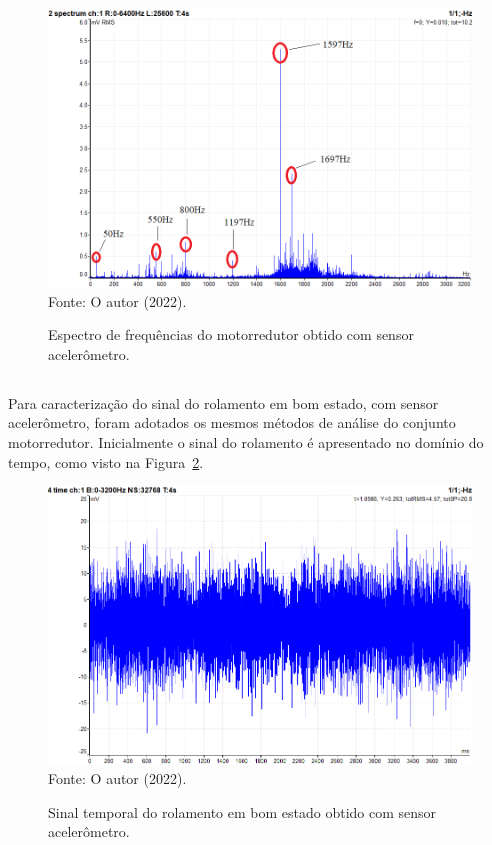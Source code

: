 \documentclass[
	12pt,				
	oneside,			
	a4paper,			
	english,			
	brazil,	
	sumario=abnt-6027-2012		
	]{abntex2ppgsi}
\begin{document}
\begin{figure}[H]
\centering
\caption {Espectro de frequências do motorredutor obtido com sensor acelerômetro.}
\includegraphics[width=\textwidth,keepaspectratio]{espectro_redutor_4v_mv_anotado} \\
Fonte: O autor (2022).
\label{ESPECTRO_ACELERACAO_MOTORREDUTOR_100HZ}
\end{figure}

\subsection{}

Para caracterização do sinal do rolamento em bom estado, com sensor acelerômetro, foram adotados os mesmos métodos de análise do conjunto motorredutor. Inicialmente o sinal do rolamento é apresentado no domínio do tempo, como visto na Figura~\ref{ROLAMENTO_BOM_ESTADO_TEMPO}.

\begin{figure}[H]
\centering
\caption {Sinal temporal do rolamento em bom estado obtido com sensor acelerômetro.}
\includegraphics[width=\textwidth,keepaspectratio]{ROLAMENTO_BOM_ESTADO_TEMPO} \\
Fonte: O autor (2022).
\label{ROLAMENTO_BOM_ESTADO_TEMPO}
\end{figure}
\end{document}
